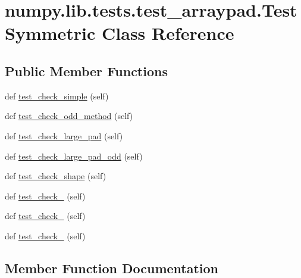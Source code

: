 \hypertarget{classnumpy_1_1lib_1_1tests_1_1test__arraypad_1_1TestSymmetric}{}\section{numpy.\+lib.\+tests.\+test\+\_\+arraypad.\+Test\+Symmetric Class Reference}
\label{classnumpy_1_1lib_1_1tests_1_1test__arraypad_1_1TestSymmetric}
\subsection*{Public Member Functions}
\begin{DoxyCompactItemize}
\item 
def \hyperlink{classnumpy_1_1lib_1_1tests_1_1test__arraypad_1_1TestSymmetric_a3bb3ec130d3e45492a21522f8856a3d2}{test\+\_\+check\+\_\+simple} (self)
\item 
def \hyperlink{classnumpy_1_1lib_1_1tests_1_1test__arraypad_1_1TestSymmetric_a8fd3f266fe0ed2a440ad65cdad05ed77}{test\+\_\+check\+\_\+odd\+\_\+method} (self)
\item 
def \hyperlink{classnumpy_1_1lib_1_1tests_1_1test__arraypad_1_1TestSymmetric_ac8c6e143f21baf49ca20191ec853030d}{test\+\_\+check\+\_\+large\+\_\+pad} (self)
\item 
def \hyperlink{classnumpy_1_1lib_1_1tests_1_1test__arraypad_1_1TestSymmetric_a9cc0d8a42b5f4d74ba053c666c632500}{test\+\_\+check\+\_\+large\+\_\+pad\+\_\+odd} (self)
\item 
def \hyperlink{classnumpy_1_1lib_1_1tests_1_1test__arraypad_1_1TestSymmetric_a78760ecbe5436dfd6e099277c6e916bf}{test\+\_\+check\+\_\+shape} (self)
\item 
def \hyperlink{classnumpy_1_1lib_1_1tests_1_1test__arraypad_1_1TestSymmetric_a501e60959e9167f64eb7e534ad9b8af4}{test\+\_\+check\+\_} (self)
\item 
def \hyperlink{classnumpy_1_1lib_1_1tests_1_1test__arraypad_1_1TestSymmetric_a0644927a8fab8e0872d9786d416591dd}{test\+\_\+check\+\_} (self)
\item 
def \hyperlink{classnumpy_1_1lib_1_1tests_1_1test__arraypad_1_1TestSymmetric_a9bedd2486d45e8b19f788e55a1b99db9}{test\+\_\+check\+\_} (self)
\end{DoxyCompactItemize}


\subsection{Member Function Documentation}
\mbox{\label{classnumpy_1_1lib_1_1tests_1_1test__arraypad_1_1TestSymmetric_a501e60959e9167f64eb7e534ad9b8af4}} 
